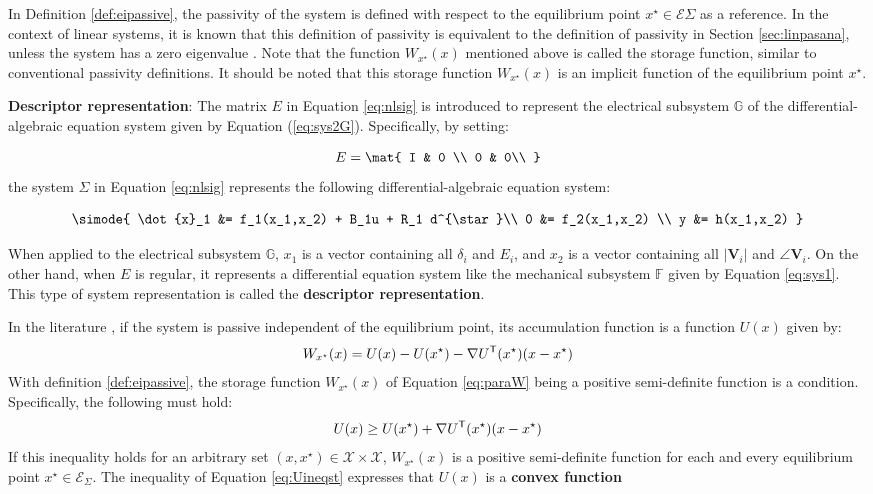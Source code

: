 \documentclass[graybox, envcountchap]{svmult}
\begin{document}
In Definition \ref{def:eipassive}, the passivity of the system is defined with
respect to the equilibrium point $x^{\star} \in \mathcal{E}{\Sigma}$ as a
reference. In the context of linear systems, it is known that this definition of
passivity is equivalent to the definition of passivity in Section
\ref{sec:linpasana}, unless the system has a zero eigenvalue
\cite{hines2011equilibrium}. Note that the function $W_{x^{\star}}(x)$ mentioned
above is called the storage function, similar to conventional passivity
definitions. It should be noted that this storage function $W_{x^{\star}}(x)$ is
an implicit function of the equilibrium point $x^{\star}$.

\begin{COLUMN}
\noindent \textbf{Descriptor representation}:
The matrix $E$ in Equation \ref{eq:nlsig} is introduced to represent the
electrical subsystem $\mathds{G}$ of the differential-algebraic equation system
given by Equation (\ref{eq:sys2G}). Specifically, by setting:

\[
  E=\mat{
  I & 0 \\
  0 & 0\\ 
  }
\]
the system $\Sigma$ in Equation \ref{eq:nlsig} represents the following
differential-algebraic equation system:

\begin{equation*}
  \simode{
    \dot{x}_1 &= f_1(x_1,x_2) + B_1u + R_1 d^{\star}\\
    0 &= f_2(x_1,x_2) \\
    y &= h(x_1,x_2)
  }
\end{equation*}

When applied to the electrical subsystem $\mathds{G}$, $x_1$ is a vector
containing all $\delta_i$ and $E_i$, and $x_2$ is a vector containing all
$|\bm{V}_i|$ and $\angle \bm{V}_i$. On the other hand, when $E$ is regular, it
represents a differential equation system like the mechanical subsystem
$\mathds{F}$ given by Equation \ref{eq:sys1}. This type of system
representation is called the \textbf{descriptor representation}.
\end{COLUMN}

In the literature \cite{simpson2019equilibrium}, if the system is passive independent of the equilibrium point, its accumulation function is a function $U(x)$ given by:
\begin{align}\label{eq:paraW}
W_{x^{\star}}(x) = U(x) - U(x^{\star}) - \nabla U^{\sf T}(x^{\star}) (x-x^{\star})
\end{align}
With definition \ref{def:eipassive}, the storage function $W_{x^{\star}}(x)$ of Equation \ref{eq:paraW} being a positive semi-definite function is a condition.
Specifically, the following must hold:
\begin{align}\label{eq:Uineqst}
U(x) \geq  U(x^{\star}) + \nabla U^{\sf T}(x^{\star}) (x-x^{\star})
\end{align}
If this inequality holds for an arbitrary set $(x,x^{\star}) \in \mathcal{X} \times \mathcal{X}$, $W_{x^{\star}}(x)$ is a positive semi-definite function for each and every equilibrium point $x^{\star} \in \mathcal{E}_{\Sigma}$.
The inequality of Equation \ref{eq:Uineqst} expresses that $U(x)$ is a \textbf{convex function}
\end{document}
